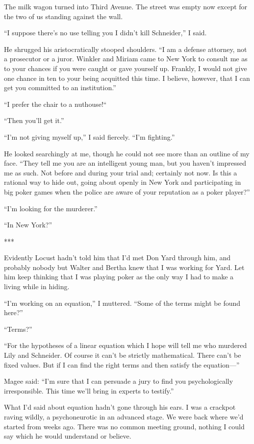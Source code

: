 \documentclass{novel}
\begin{document}
The milk wagon turned into Third Avenue. The street was empty now except for the two of us standing against the wall.

“I suppose there’s no use telling you I didn’t kill Schneider,” I said.

He shrugged his aristocratically stooped shoulders. “I am a defense attorney, not a prosecutor or a juror. Winkler and Miriam came to New York to consult me as to your chances if you were caught or gave yourself up. Frankly, I would not give one chance in ten to your being acquitted this time. I believe, however, that I can get you committed to an institution.”

“I prefer the chair to a nuthouse!“

“Then you’ll get it.”

“I’m not giving myself up,” I said fiercely. “I’m fighting.”

He looked searchingly at me, though he could not see more than an outline of my face. “They tell me you are an intelligent young man, but you haven’t impressed me as such. Not before and during your trial and; certainly not now. Is this a rational way to hide out, going about openly in New York and participating in big poker games when the police are aware of your reputation as a poker player?”

“I’m looking for the murderer.”

“In New York?”

***

Evidently Locust hadn’t told him that I’d met Don Yard through him, and probably nobody but Walter and Bertha knew that I was working for Yard. Let him keep thinking that I was playing poker as the only way I had to make a living while in hiding.

“I’m working on an equation,” I muttered. “Some of the terms might be found here?”

“Terms?”

“For the hypotheses of a linear equation which I hope will tell me who murdered Lily and Schneider. Of course it can’t be strictly mathematical. There can’t be fixed values. But if I can find the right terms and then satisfy the equation—”

Magee said: “I’m sure that I can persuade a jury to find you psychologically irresponsible. This time we’ll bring in experts to testify.”

What I’d said about equation hadn’t gone through his ears. I was a crackpot raving wildly, a psychoneurotic in an advanced stage. We were back where we’d started from weeks ago. There was no common meeting ground, nothing I could say which he would understand or believe.
\end{document}
